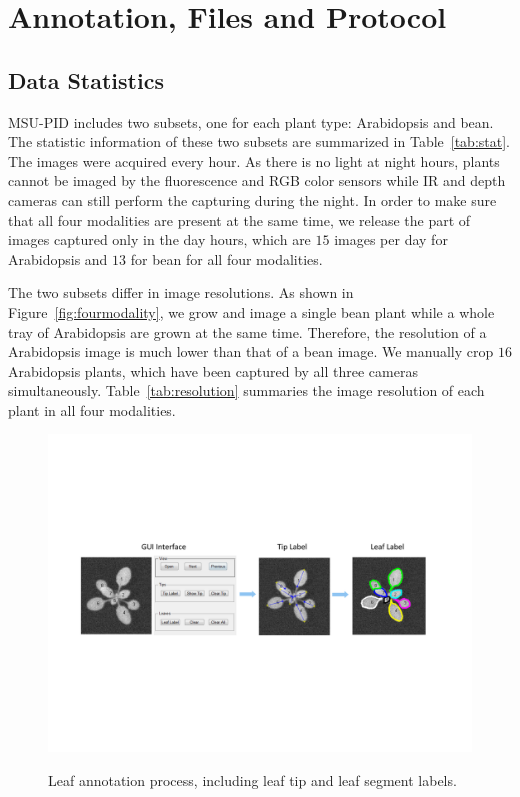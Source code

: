 \section{Annotation, Files and Protocol}
\subsection{Data Statistics}
MSU-PID includes two subsets, one for each plant type: Arabidopsis and bean.
The statistic information of these two subsets are summarized in Table~\ref{tab:stat}.
The images were acquired every hour.
As there is no light at night hours, plants cannot be imaged by the fluorescence and RGB color sensors while IR and depth cameras can still perform the capturing during the night.
In order to make sure that all four modalities are present at the same time, we release the part of images captured only in the day hours, which are $15$ images per day for Arabidopsis and $13$ for bean for all four modalities.

The two subsets differ in image resolutions.
As shown in Figure~\ref{fig:fourmodality}, we grow and image a single bean plant while a whole tray of Arabidopsis are grown at the same time.
Therefore, the resolution of a Arabidopsis image is much lower than that of a bean image.
We manually crop $16$ Arabidopsis plants, which have been captured by all three cameras simultaneously.
Table~\ref{tab:resolution} summaries the image resolution of each plant in all four modalities.


\begin{figure}
\centering
\includegraphics[width=.90\textwidth]{Figures/labeling}\\
\caption{Leaf annotation process, including leaf tip and leaf segment labels.}
\label{fig:label}
\end{figure}

